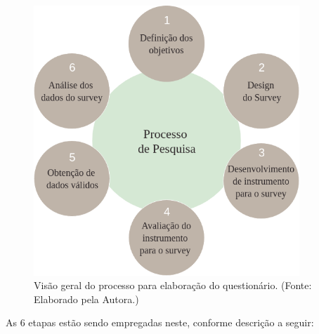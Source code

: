         \begin{figure}[h]
          \centering
          \includegraphics[width=10cm]{figuras/survey.png}
          \caption{Visão geral do processo para elaboração do questionário.  (Fonte: Elaborado pela Autora.)}
          \label{fig:Abordagem}

        \end{figure}

As 6 etapas estão sendo empregadas neste, conforme descrição a seguir:

